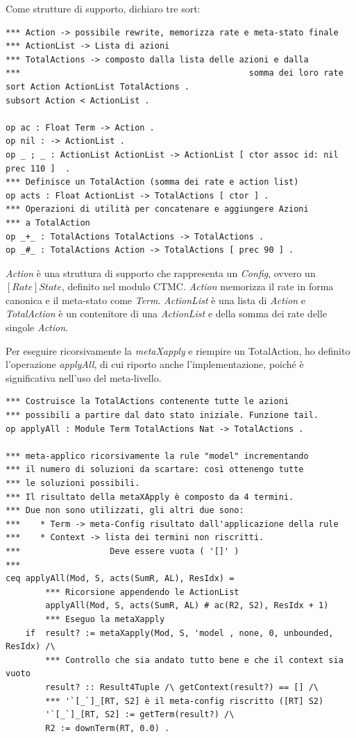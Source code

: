 Come strutture di supporto, dichiaro tre sort:
\begin{Verbatim}[fontsize=\small]
*** Action -> possibile rewrite, memorizza rate e meta-stato finale
*** ActionList -> Lista di azioni
*** TotalActions -> composto dalla lista delle azioni e dalla
***                                              somma dei loro rate
sort Action ActionList TotalActions .
subsort Action < ActionList .

op ac : Float Term -> Action .
op nil : -> ActionList .
op _ ; _ : ActionList ActionList -> ActionList [ ctor assoc id: nil prec 110 ]  .
*** Definisce un TotalAction (somma dei rate e action list)
op acts : Float ActionList -> TotalActions [ ctor ] .
*** Operazioni di utilità per concatenare e aggiungere Azioni
*** a TotalAction
op _+_ : TotalActions TotalActions -> TotalActions .
op _#_ : TotalActions Action -> TotalActions [ prec 90 ] .
\end{Verbatim}
\emph{Action} è una struttura di supporto che rappresenta un \emph{Config},
ovvero un $[Rate] State$, definito nel modulo CTMC. \emph{Action} memorizza il
rate in forma canonica e il meta-stato come \emph{Term}.
\emph{ActionList} è una lista di \emph{Action} e \emph{TotalAction} è un
contenitore di una \emph{ActionList} e della somma dei rate delle singole
\emph{Action}.

Per eseguire ricorsivamente la \emph{metaXapply} e riempire un TotalAction,
ho definito l'operazione \emph{applyAll}, di cui riporto anche
l'implementazione, poiché è significativa nell'uso del meta-livello.

\begin{Verbatim}[fontsize=\small]
*** Costruisce la TotalActions contenente tutte le azioni
*** possibili a partire dal dato stato iniziale. Funzione tail.
op applyAll : Module Term TotalActions Nat -> TotalActions .

*** meta-applico ricorsivamente la rule "model" incrementando
*** il numero di soluzioni da scartare: così ottenengo tutte
*** le soluzioni possibili. 
*** Il risultato della metaXApply è composto da 4 termini.
*** Due non sono utilizzati, gli altri due sono:
***	   * Term -> meta-Config risultato dall'applicazione della rule
***	   * Context -> lista dei termini non riscritti.
***                  Deve essere vuota ( '[]' )
***
ceq applyAll(Mod, S, acts(SumR, AL), ResIdx) = 
        *** Ricorsione appendendo le ActionList
        applyAll(Mod, S, acts(SumR, AL) # ac(R2, S2), ResIdx + 1)
        *** Eseguo la metaXapply
    if  result? := metaXapply(Mod, S, 'model , none, 0, unbounded, ResIdx) /\
        *** Controllo che sia andato tutto bene e che il context sia vuoto
        result? :: Result4Tuple /\ getContext(result?) == [] /\
        *** '`[_`]_[RT, S2] è il meta-config riscritto ([RT] S2)
        '`[_`]_[RT, S2] := getTerm(result?) /\
        R2 := downTerm(RT, 0.0) .
\end{Verbatim}

